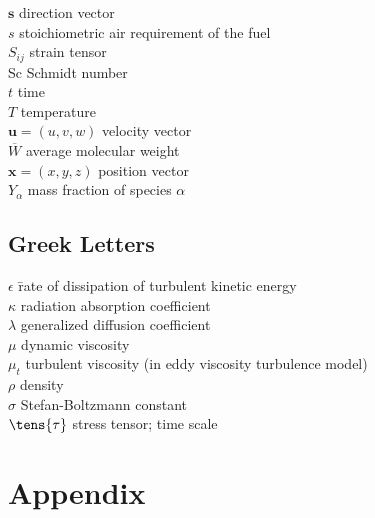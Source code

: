 \documentclass[graybox]{svmult}
\begin{document}
\begin{tabbing}
$\mathbf{s}$	         \> direction vector \\
$s$	                     \> stoichiometric air requirement of the fuel \\
$S_{ij}$ 	             \> strain tensor \\
Sc	                     \> Schmidt number \\
$t$	                     \> time \\
$T$	                     \> temperature \\
$\mathbf{u}=(u,v,w)$     \> velocity vector \\
$\overline{W}$	         \> average molecular weight \\
$\mathbf{x}=(x,y,z)$	 \> position vector \\
$Y_\alpha$               \> mass fraction of species $\alpha$
\end{tabbing}

\subsection{Greek Letters}

\begin{tabbing}
$\epsilon$ \hspace{1in}  \= rate of dissipation of turbulent kinetic energy \\
$\kappa$                 \> radiation absorption coefficient \\
$\lambda$                \> generalized diffusion coefficient \\
$\mu$                    \> dynamic viscosity \\
$\mu_t$                  \> turbulent viscosity (in eddy viscosity turbulence model) \\
$\rho$                   \> density \\
$\sigma$                 \> Stefan-Boltzmann constant \\
$\tens{\tau}$	         \> stress tensor; time scale
\end{tabbing}





\section*{Appendix}
\end{document}
